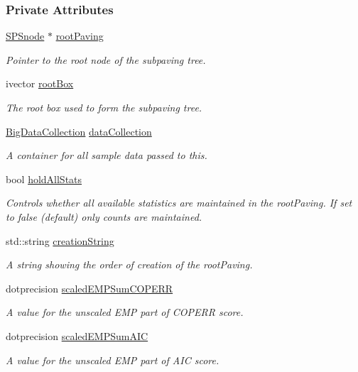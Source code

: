 \subsubsection*{\-Private \-Attributes}
\begin{DoxyCompactItemize}
\item 
\hyperlink{classsubpavings_1_1SPSnode}{\-S\-P\-Snode} $\ast$ \hyperlink{classsubpavings_1_1AdaptiveHistogram_a88a104768020c02deb2a7df9e2b4cb3a}{root\-Paving}
\begin{DoxyCompactList}\small\item\em \-Pointer to the root node of the subpaving tree. \end{DoxyCompactList}\item 
ivector \hyperlink{classsubpavings_1_1AdaptiveHistogram_a5afac4246153fef0b383f6eb2e9d23a6}{root\-Box}
\begin{DoxyCompactList}\small\item\em \-The root box used to form the subpaving tree. \end{DoxyCompactList}\item 
\hyperlink{namespacesubpavings_aa79f33663da92502ce1a37f3fd1f3d85}{\-Big\-Data\-Collection} \hyperlink{classsubpavings_1_1AdaptiveHistogram_afb02d0a6fe2258620130b97b7901e214}{data\-Collection}
\begin{DoxyCompactList}\small\item\em \-A container for all sample data passed to this. \end{DoxyCompactList}\item 
bool \hyperlink{classsubpavings_1_1AdaptiveHistogram_a3f9319019a75ea477804d02762602d17}{hold\-All\-Stats}
\begin{DoxyCompactList}\small\item\em \-Controls whether all available statistics are maintained in the root\-Paving. \-If set to false (default) only counts are maintained. \end{DoxyCompactList}\item 
std\-::string \hyperlink{classsubpavings_1_1AdaptiveHistogram_a1211a42d1f428d73db9ba3c035239c59}{creation\-String}
\begin{DoxyCompactList}\small\item\em \-A string showing the order of creation of the root\-Paving. \end{DoxyCompactList}\item 
dotprecision \hyperlink{classsubpavings_1_1AdaptiveHistogram_acd3c0bacd5148b82188cc129b3a59e96}{scaled\-E\-M\-P\-Sum\-C\-O\-P\-E\-R\-R}
\begin{DoxyCompactList}\small\item\em \-A value for the unscaled \-E\-M\-P part of \-C\-O\-P\-E\-R\-R score. \end{DoxyCompactList}\item 
dotprecision \hyperlink{classsubpavings_1_1AdaptiveHistogram_ad5748390a25f398475bb60575f0e9a89}{scaled\-E\-M\-P\-Sum\-A\-I\-C}
\begin{DoxyCompactList}\small\item\em \-A value for the unscaled \-E\-M\-P part of \-A\-I\-C score. \end{DoxyCompactList}\end{DoxyCompactItemize}
